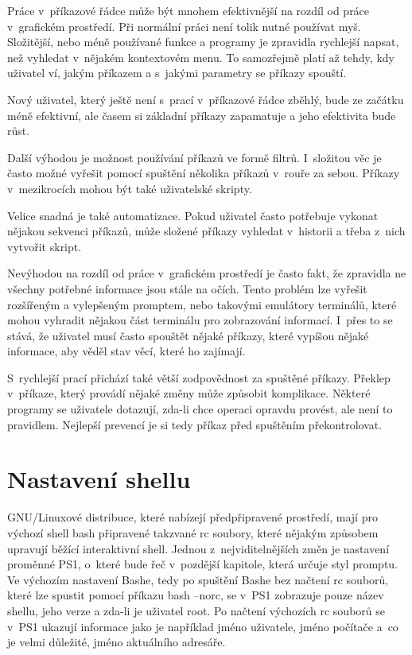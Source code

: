 \documentclass[thesis=M,czech]{FITthesis}[2012/06/26]
\begin{document}
Práce v~příkazové řádce může být mnohem efektivnější na rozdíl od práce v~grafickém prostředí. Při normální práci není tolik nutné používat myš. Složitější, nebo méně používané funkce a programy je zpravidla rychlejší napsat, než vyhledat v~nějakém kontextovém menu. To samozřejmě platí až tehdy, kdy uživatel ví, jakým příkazem a s~jakými parametry se příkazy spouští.

Nový uživatel, který ještě není s~prací v~příkazové řádce zběhlý, bude ze začátku méně efektivní, ale časem si základní příkazy zapamatuje a jeho efektivita bude růst.

Další výhodou je možnost používání příkazů ve formě filtrů. I~složitou věc je často možné vyřešit pomocí spuštění několika příkazů v~rouře za sebou. Příkazy v~mezikrocích mohou být také uživatelské skripty.

Velice snadná je také automatizace. Pokud uživatel často potřebuje vykonat nějakou sekvenci příkazů, může složené příkazy vyhledat v~historii a třeba z~nich vytvořit skript.

Nevýhodou na rozdíl od práce v~grafickém prostředí je často fakt, že zpravidla ne všechny potřebné informace jsou stále na očích. Tento problém lze vyřešit rozšířeným a vylepšeným promptem, nebo takovými emulátory terminálů, které mohou vyhradit nějakou část terminálu pro zobrazování informací. I~přes to se stává, že uživatel musí často spouštět nějaké příkazy, které vypíšou nějaké informace, aby věděl stav věcí, které ho zajímají.

S~rychlejší prací přichází také větší zodpovědnost za spuštěné příkazy. Překlep v~příkaze, který provádí nějaké změny může způsobit komplikace. Některé programy se uživatele dotazují, zda-li chce operaci opravdu provést, ale není to pravidlem. Nejlepší prevencí je si tedy příkaz před spuštěním překontrolovat.


%
%
%
\section{Nastavení shellu}

GNU/Linuxové distribuce, které nabízejí předpřipravené prostředí, mají pro výchozí shell bash připravené takzvané rc soubory, které nějakým způsobem upravují běžící interaktivní shell. Jednou z~nejviditelnějších změn je nastavení proměnné PS1, o~které bude řeč v~pozdější kapitole, která určuje styl promptu. Ve výchozím nastavení Bashe, tedy po spuštění Bashe bez načtení rc souborů, které lze spustit pomocí příkazu bash --norc, se v~PS1 zobrazuje pouze název shellu, jeho verze a zda-li je uživatel root. Po načtení výchozích rc souborů se v~PS1 ukazují informace jako je například jméno uživatele, jméno počítače a~co je velmi důležité, jméno aktuálního adresáře.
\end{document}

